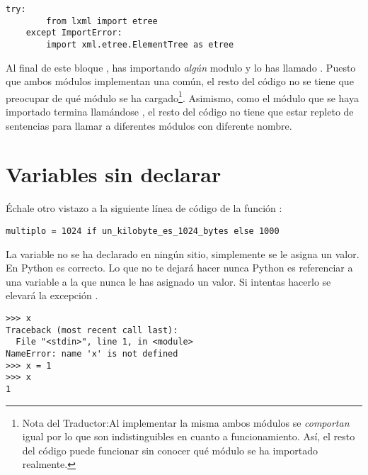 \noindent\begin{minipage}{\textwidth}
\begin{lstlisting}[mathescape=True]
    try:
        from lxml import etree
    except ImportError:
        import xml.etree.ElementTree as etree
\end{lstlisting}
\end{minipage}

Al final de este bloque , has importando \emph{algún} modulo y lo has llamado . Puesto que ambos módulos implementan una  común, el resto del código no se tiene que preocupar de qué módulo se ha cargado\footnote{Nota del Traductor:Al implementar la misma  ambos módulos se \emph{comportan} igual por lo que son indistinguibles en cuanto a funcionamiento. Así, el resto del código puede funcionar sin conocer qué módulo se ha importado realmente.}. Asimismo, como el módulo que se haya importado termina llamándose , el resto del código no tiene que estar repleto de sentencias  para llamar a diferentes módulos con diferente nombre.

\section{Variables sin declarar}

Échale otro vistazo a la siguiente línea de código de la función :

\noindent\begin{minipage}{\textwidth}
\begin{lstlisting}[mathescape=True]
    multiplo = 1024 if un_kilobyte_es_1024_bytes else 1000
\end{lstlisting}
\end{minipage}

La variable  no se ha declarado en ningún sitio, simplemente se le asigna un valor. En Python es correcto. Lo que no te dejará hacer nunca Python es referenciar a una variable a la que nunca le has asignado un valor. Si intentas hacerlo se elevará la excepción .

\noindent\begin{minipage}{\textwidth}
\begin{lstlisting}[mathescape=True]
>>> x
Traceback (most recent call last):
  File "<stdin>", line 1, in <module>
NameError: name 'x' is not defined
>>> x = 1
>>> x
1
\end{lstlisting}
\end{minipage}

